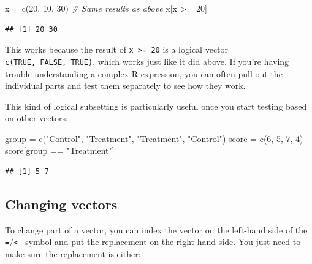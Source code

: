 \documentclass[
]{book}
\newenvironment{Shaded}{\begin{snugshade}}{\end{snugshade}}
\newcommand{\CommentTok}[1]{\textcolor[rgb]{0.56,0.35,0.01}{\textit{#1}}}
\newcommand{\DecValTok}[1]{\textcolor[rgb]{0.00,0.00,0.81}{#1}}
\newcommand{\FunctionTok}[1]{\textcolor[rgb]{0.00,0.00,0.00}{#1}}
\newcommand{\NormalTok}[1]{#1}
\newcommand{\OtherTok}[1]{\textcolor[rgb]{0.56,0.35,0.01}{#1}}
\newcommand{\SpecialCharTok}[1]{\textcolor[rgb]{0.00,0.00,0.00}{#1}}
\newcommand{\StringTok}[1]{\textcolor[rgb]{0.31,0.60,0.02}{#1}}
\begin{document}
\begin{Shaded}
\begin{Highlighting}[]
\NormalTok{x }\OtherTok{=} \FunctionTok{c}\NormalTok{(}\DecValTok{20}\NormalTok{, }\DecValTok{10}\NormalTok{, }\DecValTok{30}\NormalTok{)}
\CommentTok{\# Same results as above}
\NormalTok{x[x }\SpecialCharTok{\textgreater{}=} \DecValTok{20}\NormalTok{]}
\end{Highlighting}
\end{Shaded}

\begin{verbatim}
## [1] 20 30
\end{verbatim}

This works because the result of \texttt{x\ \textgreater{}=\ 20} is a logical vector
\texttt{c(TRUE,\ FALSE,\ TRUE)}, which works just like it did above. If you're having
trouble understanding a complex R expression, you can often pull out the
individual parts and test them separately to see how they work.

This kind of logical subsetting is particularly useful
once you start testing based on other vectors:

\begin{Shaded}
\begin{Highlighting}[]
\NormalTok{group }\OtherTok{=} \FunctionTok{c}\NormalTok{(}\StringTok{"Control"}\NormalTok{, }\StringTok{"Treatment"}\NormalTok{, }\StringTok{"Treatment"}\NormalTok{, }\StringTok{"Control"}\NormalTok{)}
\NormalTok{score }\OtherTok{=} \FunctionTok{c}\NormalTok{(}\DecValTok{6}\NormalTok{, }\DecValTok{5}\NormalTok{, }\DecValTok{7}\NormalTok{, }\DecValTok{4}\NormalTok{)}
\NormalTok{score[group }\SpecialCharTok{==} \StringTok{"Treatment"}\NormalTok{]}
\end{Highlighting}
\end{Shaded}

\begin{verbatim}
## [1] 5 7
\end{verbatim}

\hypertarget{changing-vectors}{%
\subsection{Changing vectors}\label{changing-vectors}}

To change part of a vector, you can index the vector on the left-hand
side of the \texttt{=}/\texttt{\textless{}-} symbol and put the replacement on the right-hand
side. You just need to make sure the replacement is either:
\end{document}
